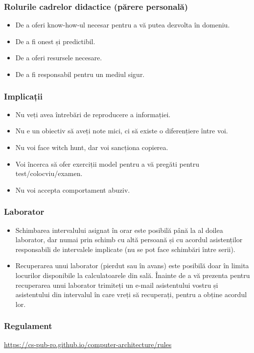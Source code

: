 \begin{frame}
    \frametitle{Rolurile cadrelor didactice (părere personală)}
\begin{itemize}
    \item De a oferi know-how-ul necesar pentru a vă putea dezvolta în domeniu.
    \item De a fi onest și predictibil.
    \item De a oferi resursele necesare.
    \item De a fi responsabil pentru un mediul sigur.
\end{itemize}

\end{frame}

\begin{frame}
    \frametitle{Implicații}
\begin{itemize}
    \item Nu veți avea întrebări de reproducere a informației.
    \item Nu e un obiectiv să aveți note mici, ci să existe o diferențiere între voi.
    \item Nu voi face witch hunt, dar voi sancționa copierea.
    \item Voi încerca să ofer exerciții model pentru a vă pregăti pentru test/colocviu/examen.
    \item Nu voi accepta comportament abuziv.
\end{itemize}

\end{frame}

\begin{frame}
    \frametitle{Laborator}
    
\begin{itemize}
    \item Schimbarea intervalului asignat în orar este posibilă până la al doilea laborator, dar numai prin schimb cu altă persoană și cu acordul asistenților responsabili de intervalele implicate (nu se pot face schimbări între serii).
    \item Recuperarea unui laborator (pierdut sau în avans) este posibilă doar în limita locurilor disponibile la calculatoarele din sală. Înainte de a vă prezenta pentru recuperarea unui laborator trimiteți un e-mail asistentului vostru și asistentului din intervalul în care vreți să recuperați, pentru a obține acordul lor.
\end{itemize}
\end{frame}


\begin{frame}
    \frametitle{Regulament}
    
    \href{https://cs-pub-ro.github.io/computer-architecture/rules}{https://cs-pub-ro.github.io/computer-architecture/rules}

\end{frame}